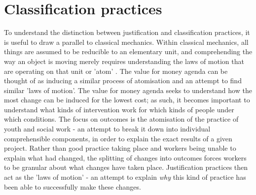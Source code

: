 \section{Classification practices}
\label{sec:6-6-classification-practices}
To understand the distinction between justification and classification practices, it is useful to draw a parallel to classical mechanics. Within classical mechanics, all things are assumed to be reducible to an elementary unit, and comprehending the way an object is moving merely requires understanding the laws of motion that are operating on that unit or 'atom' \citep{capra_web_1996}. The value for money agenda can be thought of as inducing a similar process of atomisation and an attempt to find similar 'laws of motion'. The value for money agenda seeks to understand how the most change can be induced for the lowest cost; as such, it becomes important to understand what kinds of intervention work for which kinds of people under which conditions. The focus on outcomes is the atomisation of the practice of youth and social work - an attempt to break it down into individual comprehensible components, in order to explain the exact results of a given project. Rather than good practice taking place and workers being unable to explain what had changed, the splitting of changes into outcomes forces workers to be granular about what changes have taken place. Justification practices then act as the 'laws of motion' - an attempt to explain \emph{why} this kind of practice has been able to successfully make these changes. 

